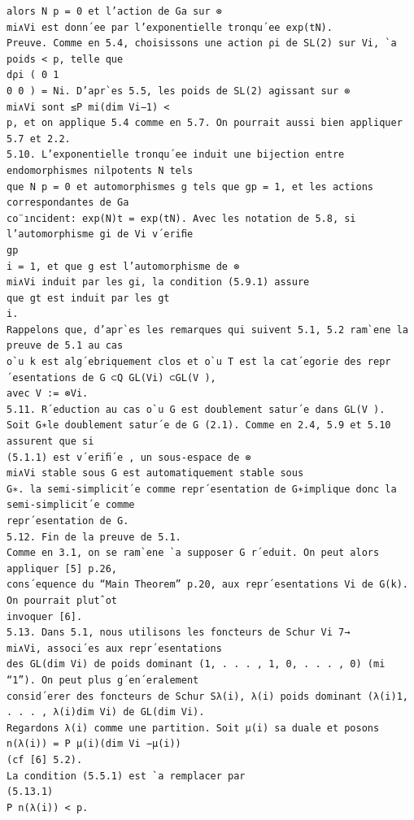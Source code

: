 \documentclass[10pt]{article}
\begin{document}
\begin{verbatim}
alors N p = 0 et l’action de Ga sur ⊗
mi∧Vi est donn´ee par l’exponentielle tronqu´ee exp(tN).
Preuve. Comme en 5.4, choisissons une action ρi de SL(2) sur Vi, `a poids < p, telle que
dρi ( 0 1
0 0 ) = Ni. D’apr`es 5.5, les poids de SL(2) agissant sur ⊗
mi∧Vi sont ≤P mi(dim Vi−1) <
p, et on applique 5.4 comme en 5.7. On pourrait aussi bien appliquer 5.7 et 2.2.
5.10. L’exponentielle tronqu´ee induit une bijection entre endomorphismes nilpotents N tels
que N p = 0 et automorphismes g tels que gp = 1, et les actions correspondantes de Ga
co¨ıncident: exp(N)t = exp(tN). Avec les notation de 5.8, si l’automorphisme gi de Vi v´eriﬁe
gp
i = 1, et que g est l’automorphisme de ⊗
mi∧Vi induit par les gi, la condition (5.9.1) assure
que gt est induit par les gt
i.
Rappelons que, d’apr`es les remarques qui suivent 5.1, 5.2 ram`ene la preuve de 5.1 au cas
o`u k est alg´ebriquement clos et o`u T est la cat´egorie des repr´esentations de G ⊂Q GL(Vi) ⊂GL(V ),
avec V := ⊗Vi.
5.11. R´eduction au cas o`u G est doublement satur´e dans GL(V ).
Soit G∗le doublement satur´e de G (2.1). Comme en 2.4, 5.9 et 5.10 assurent que si
(5.1.1) est v´eriﬁ´e , un sous-espace de ⊗
mi∧Vi stable sous G est automatiquement stable sous
G∗. la semi-simplicit´e comme repr´esentation de G∗implique donc la semi-simplicit´e comme
repr´esentation de G.
5.12. Fin de la preuve de 5.1.
Comme en 3.1, on se ram`ene `a supposer G r´eduit. On peut alors appliquer [5] p.26,
cons´equence du “Main Theorem” p.20, aux repr´esentations Vi de G(k). On pourrait plutˆot
invoquer [6].
5.13. Dans 5.1, nous utilisons les foncteurs de Schur Vi 7→
mi∧Vi, associ´es aux repr´esentations
des GL(dim Vi) de poids dominant (1, . . . , 1, 0, . . . , 0) (mi “1”). On peut plus g´en´eralement
consid´erer des foncteurs de Schur Sλ(i), λ(i) poids dominant (λ(i)1, . . . , λ(i)dim Vi) de GL(dim Vi).
Regardons λ(i) comme une partition. Soit µ(i) sa duale et posons
n(λ(i)) = P µ(i)(dim Vi −µ(i))
(cf [6] 5.2).
La condition (5.5.1) est `a remplacer par
(5.13.1)
P n(λ(i)) < p.


\end{verbatim}
\end{document}
